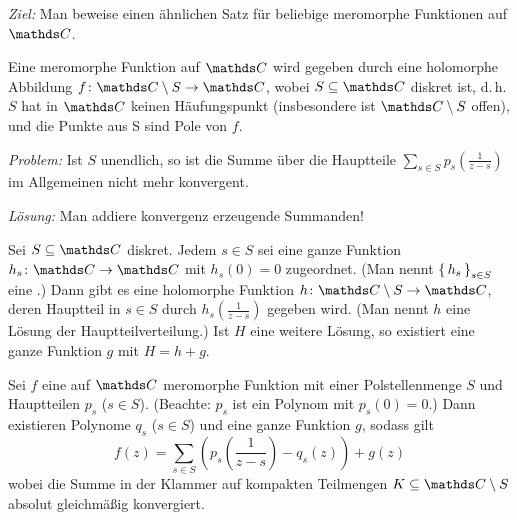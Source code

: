 \emph{Ziel:} Man beweise einen ähnlichen Satz für beliebige meromorphe Funktionen auf $\CC$.

\begin{erin*}
Eine meromorphe Funktion auf $\CC$ wird gegeben durch eine holomorphe Abbildung $f\colon \CC\setminus S \ra \CC$, wobei $S\subseteq \CC$ diskret ist, d.\,h. $S$ hat in $\CC$ keinen Häufungspunkt (insbesondere ist $\CC\setminus S$ offen), und die Punkte aus S sind Pole von $f$.
\end{erin*}

\emph{Problem:} Ist $S$ unendlich, so ist die Summe über die Hauptteile $\sum _{s \in S} p_s(\frac{1}{z-s})$ im Allgemeinen nicht mehr konvergent.

\emph{Lösung:} Man addiere konvergenz erzeugende Summanden!

\begin{satz-list}
\item Sei $S\subseteq\CC$ diskret. Jedem $s \in S$ sei eine ganze Funktion $h_s\colon \CC \ra \CC$ mit $h_s(0) = 0$ zugeordnet.
(Man nennt $\left\{\,h_s\,\right\}_{s \in S}$ eine .)
Dann gibt es eine holomorphe Funktion $h\colon \CC\setminus S \ra \CC$, deren Hauptteil in $s\in S$ durch $h_s(\frac{1}{z-s})$ gegeben wird.
(Man nennt $h$ eine Lösung der Hauptteilverteilung.)
Ist $H$ eine weitere Lösung, so existiert eine ganze Funktion $g$ mit $H = h + g$.
\item Sei $f$ eine auf $\CC$ meromorphe Funktion mit einer Polstellenmenge $S$ und Hauptteilen $p_s$ ($s\in S$).
(Beachte: $p_s$ ist ein Polynom mit $p_s(0) = 0$.)
Dann existieren Polynome $q_s$ ($s \in S$) und eine ganze Funktion $g$, sodass gilt
\[
	f(z) = \sum \limits _{s\in S} \left(p_s\left(\frac{1}{z-s}\right) - q_s(z)\right) + g(z)
\]
wobei die Summe in der Klammer auf kompakten Teilmengen $K \subseteq \CC \setminus S$ absolut gleichmäßig konvergiert.
\end{satz-list}

